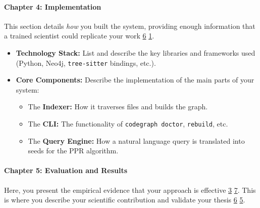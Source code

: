 \documentclass{article}
\begin{document}
\paragraph{\textbf{Chapter 4: Implementation}}

This section details \emph{how} you built the system, providing enough information that a trained scientist could replicate your work \hyperref[ref:6]{6} \hyperref[ref:1]{1}.

\begin{itemize}
\item \textbf{Technology Stack:} List and describe the key libraries and frameworks used (Python, Neo4j, \texttt{tree-sitter} bindings, etc.).


\item \textbf{Core Components:} Describe the implementation of the main parts of your system:

\begin{itemize}
\item The \textbf{Indexer:} How it traverses files and builds the graph.


\item The \textbf{CLI:} The functionality of \texttt{codegraph doctor}, \texttt{rebuild}, etc.


\item The \textbf{Query Engine:} How a natural language query is translated into seeds for the PPR algorithm.


\end{itemize}


\end{itemize}

\paragraph{\textbf{Chapter 5: Evaluation and Results}}

Here, you present the empirical evidence that your approach is effective \hyperref[ref:3]{3} \hyperref[ref:7]{7}. This is where you describe your scientific contribution and validate your thesis \hyperref[ref:6]{6} \hyperref[ref:5]{5}.
\end{document}
